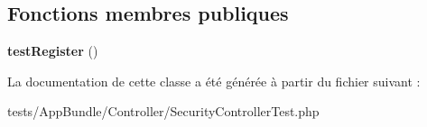 \subsection*{Fonctions membres publiques}
\begin{DoxyCompactItemize}
\item 
\mbox{\label{classTests_1_1AppBundle_1_1Controller_1_1SecurityControllerTest_a872bb08c3d26d51796c757c8e2df5a81}} 
{\bfseries test\+Register} ()
\end{DoxyCompactItemize}


La documentation de cette classe a été générée à partir du fichier suivant \+:\begin{DoxyCompactItemize}
\item 
tests/\+App\+Bundle/\+Controller/Security\+Controller\+Test.\+php\end{DoxyCompactItemize}
